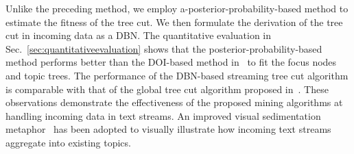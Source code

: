 Unlike the preceding method, we employ a-posterior-probability-based method to estimate the fitness of the tree cut.
We then formulate the derivation of the tree cut in incoming data as a DBN.
The quantitative evaluation in Sec.~\ref{sec:quantitativeevaluation} shows that the posterior-probability-based method performs better than the DOI-based method in~\cite{cui2014} to fit the focus nodes and topic trees.
The performance of the DBN-based streaming tree cut algorithm is comparable with that of the global tree cut algorithm proposed in~\cite{cui2014}.
These observations demonstrate the effectiveness of the proposed mining algorithms at handling incoming data in text streams.
An improved visual sedimentation metaphor~\cite{Huron2013visual} has been adopted to visually illustrate how incoming text streams aggregate into existing topics.


